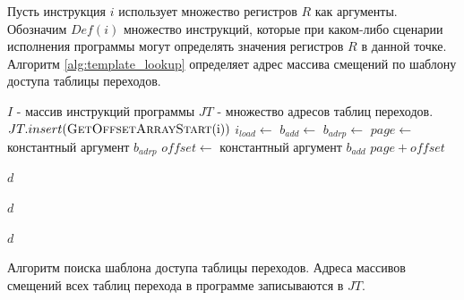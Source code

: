 \documentclass{mipt-thesis-bs}
\begin{document}
    Пусть инструкция $i$ использует множество регистров $R$ как аргументы. Обозначим $Def(i)$ множество инструкций, которые при каком-либо сценарии исполнения программы могут определять значения регистров $R$ в данной точке. Алгоритм \ref{alg:template_lookup} определяет адрес массива смещений по шаблону доступа таблицы переходов.

    \begin{algorithm}[h!]
        \begin{algorithmic}
            \State $I$ - массив инструкций программы
            \State $JT$ - множество адресов таблиц переходов.
                    \State $JT.insert(\Call{GetOffsetArrayStart}{$i$})$
                \EndIf
            \EndFor
                        \State $i_{load} \gets$ 
                        \State $b_{add} \gets$ 
                        \State $b_{adrp} \gets$ 
                        \State $page \gets$ константный аргумент $b_{adrp}$
                        \State $offset \gets$ константный аргумент $b_{add}$
                        \State \Return $page + offset$
                    \EndIf
                \EndFor
            \EndFunction

                        \State \Return $d$
                    \EndIf
                \EndFor
            \EndFunction

                        \State \Return $d$
                    \EndIf
                \EndFor
            \EndFunction

                        \State \Return $d$
                    \EndIf
                \EndFor
            \EndFunction

        \end{algorithmic}
    \caption{Алгоритм поиска шаблона доступа таблицы переходов. Адреса массивов смещений всех таблиц перехода в программе записываются в $JT$.}
    \label{alg:template_lookup}
    \end{algorithm}
\end{document}
